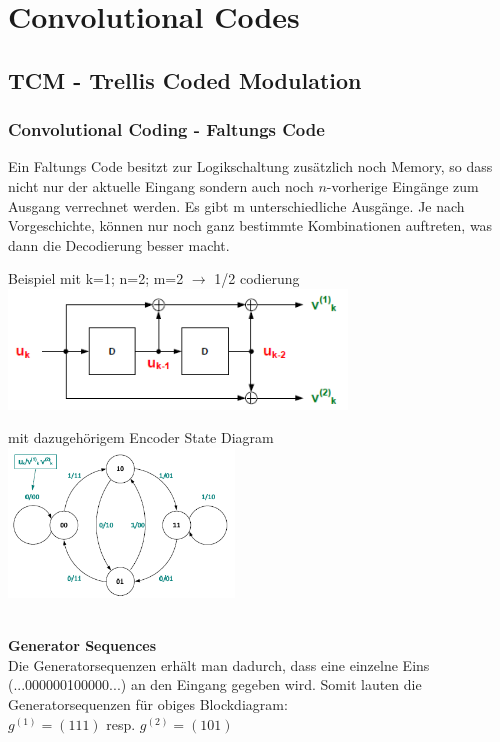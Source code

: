 \section{Convolutional Codes}
\subsection{TCM - Trellis Coded Modulation}
\subsubsection{Convolutional Coding - Faltungs Code}
Ein Faltungs Code besitzt zur Logikschaltung zus\"atzlich noch Memory, so dass
nicht nur der aktuelle Eingang sondern auch noch $n$-vorherige Eing\"ange zum
Ausgang verrechnet werden. Es gibt m unterschiedliche Ausg\"ange. 
Je nach Vorgeschichte, k\"onnen nur noch ganz bestimmte Kombinationen auftreten,
was dann die Decodierung besser macht.\\
\begin{minipage}{9cm}
	Beispiel mit k=1; n=2; m=2 $\to$ 1/2 codierung\\
	\includegraphics[width=9cm]{./bilder/covolutionSchemata.png}
\end{minipage}
\hspace{5mm}
\begin{minipage}{8cm}
\vspace{4mm}
	mit dazugeh\"origem Encoder State Diagram\\
\hspace{5mm}
	\includegraphics[width=6cm]{./bilder/covolutionStateDiagram.png}
\end{minipage}
\\
\textbf{Generator Sequences}\\
Die Generatorsequenzen erhält man dadurch, dass eine einzelne Eins (...000000100000...) an 
den Eingang gegeben wird. Somit lauten die Generatorsequenzen für obiges Blockdiagram:\\
$g^{(1)}=(1 1 1)$ resp. $g^{(2)}=(1 0 1)$

